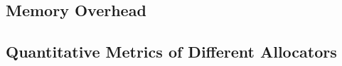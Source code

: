 \subsection{Memory Overhead}
\label{sec:memory}

\subsection{Quantitative Metrics of Different Allocators}





